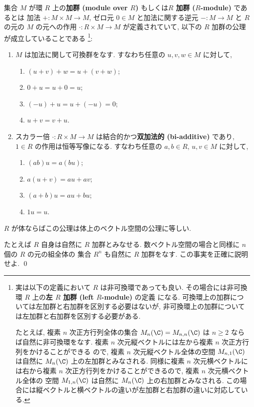 \documentclass[12pt,twoside]{jarticle}
\begin{document}
集合 $M$ が環 $R$ 上の{\bf 加群 (module over $R$)} 
もしくは{\bf $R$ 加群 ($R$-module)} であるとは
加法 $+:M\times M\to M$, ゼロ元 $0\in M$ 
と加法に関する逆元 $-:M\to M$ 
と $R$ の元の $M$ の元への作用 $\cdot:R\times M\to M$ が定義されていて, 
以下の $R$ 加群の公理が成立していることである%
\footnote{実は以下の定義において $R$ は非可換環であっても良い.
  その場合には非可換環 $R$ 上の{\bf 左 $R$ 加群 (left $R$-module)} の定義
  になる.  可換環上の加群については左加群と右加群を区別する必要はないが, 
  非可換環上の加群については左加群と右加群を区別する必要がある.

  たとえば, 複素 $n$ 次正方行列全体の集合 $M_n(\C)=M_{n,n}(\C)$ 
  は $n\ge2$ ならば自然に非可換環をなす.
  複素 $n$ 次元縦ベクトルには左から複素 $n$ 次正方行列をかけることができる
  ので, 複素 $n$ 次元縦ベクトル全体の空間 $M_{n,1}(\C)$ は自然に $M_n(\C)$
  上の左加群とみなされる.  同様に複素 $n$ 次元横ベクトルには右から複素 $n$ 
  次正方行列をかけることができるので, 複素 $n$ 次元横ベクトル全体の
  空間 $M_{1,n}(\C)$ は自然に $M_n(\C)$ 上の右加群とみなされる.
  この場合には縦ベクトルと横ベクトルの違いが左加群と右加群の違いに対応してい
  る.}:
\begin{enumerate}
\item $M$ は加法に関して可換群をなす. 
  すなわち任意の $u,v,w\in M$ に対して,
  \begin{enumerate}
  \item $(u + v) + w = u + (v + w)$;
  \item $0 + u = u + 0 = u$;
  \item $(-u) + u = u + (-u) = 0$;
  \item $u + v = v + u$.
  \end{enumerate}
\item スカラー倍 $\cdot:R\times M\to M$ は結合的かつ{\bf 双加法的 
  (bi-additive)} であり, $1\in R$ の作用は恒等写像になる.
  すなわち任意の $a,b\in R$, $u,v\in M$ に対して,
  \begin{enumerate}
  \item $(ab)u = a(bu)$;
  \item $a(u + v) = au + av$;
  \item $(a + b)u = au + bu$;
  \item $1u = u$.
  \end{enumerate}
\end{enumerate}
$R$ が体ならばこの公理は体上のベクトル空間の公理に等しい.


\begin{question}
  たとえば $R$ 自身は自然に $R$ 加群とみなせる.
  数ベクトル空間の場合と同様に $n$ 個の $R$ の元の組全体の
  集合 $R^n$ も自然に $R$ 加群をなす.
  この事実を正確に説明せよ.
  \qed
\end{question}
\end{document}
